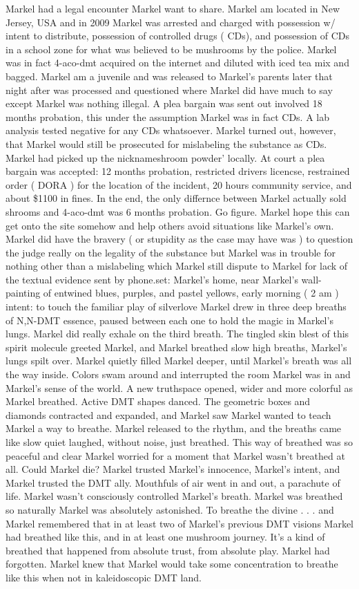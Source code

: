 \documentclass[12pt]{book}
\begin{document}
Markel had a legal encounter Markel want to share. Markel am located in New Jersey, USA and in 2009 Markel was arrested and charged with possession w/ intent to distribute, possession of controlled drugs ( CDs), and possession of CDs in a school zone for what was believed to be mushrooms by the police. Markel was in fact 4-aco-dmt acquired on the internet and diluted with iced tea mix and bagged. Markel am a juvenile and was released to Markel's parents later that night after was processed and questioned where Markel did have much to say except Markel was nothing illegal. A plea bargain was sent out involved 18 months probation, this under the assumption Markel was in fact CDs. A lab analysis tested negative for any CDs whatsoever. Markel turned out, however, that Markel would still be prosecuted for mislabeling the substance as CDs. Markel had picked up the nicknameshroom powder' locally. At court a plea bargain was accepted: 12 months probation, restricted drivers licencse, restrained order ( DORA ) for the location of the incident, 20 hours community service, and about \$1100 in fines. In the end, the only differnce between Markel actually sold shrooms and 4-aco-dmt was 6 months probation. Go figure. Markel hope this can get onto the site somehow and help others avoid situations like Markel's own. Markel did have the bravery ( or stupidity as the case may have was ) to question the judge really on the legality of the substance but Markel was in trouble for nothing other than a mislabeling which Markel still dispute to Markel for lack of the textual evidence sent by phone.set: Markel's home, near Markel's wall-painting of entwined blues, purples, and pastel yellows, early morning ( 2 am ) intent: to touch the familiar play of silverlove Markel drew in three deep breaths of N,N-DMT essence, paused between each one to hold the magic in Markel's lungs. Markel did really exhale on the third breath. The tingled skin blest of this spirit molecule greeted Markel, and Markel breathed slow high breaths, Markel's lungs spilt over. Markel quietly filled Markel deeper, until Markel's breath was all the way inside. Colors swam around and interrupted the room Markel was in and Markel's sense of the world. A new truthspace opened, wider and more colorful as Markel breathed. Active DMT shapes danced. The geometric boxes and diamonds contracted and expanded, and Markel saw Markel wanted to teach Markel a way to breathe. Markel released to the rhythm, and the breaths came like slow quiet laughed, without noise, just breathed. This way of breathed was so peaceful and clear Markel worried for a moment that Markel wasn't breathed at all. Could Markel die? Markel trusted Markel's innocence, Markel's intent, and Markel trusted the DMT ally. Mouthfuls of air went in and out, a parachute of life. Markel wasn't consciously controlled Markel's breath. Markel was breathed so naturally Markel was absolutely astonished. To breathe the divine . . .   and Markel remembered that in at least two of Markel's previous DMT visions Markel had breathed like this, and in at least one mushroom journey. It's a kind of breathed that happened from absolute trust, from absolute play. Markel had forgotten. Markel knew that Markel would take some concentration to breathe like this when not in kaleidoscopic DMT land. 
\end{document}
